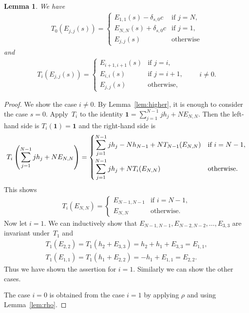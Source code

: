 \documentclass[pdftex]{sigma}
\newtheorem{lem}[thm]{Lemma}
\theoremstyle{definition}
\numberwithin{equation}{section}
\newcommand{\bfid}{\mathbf{1}}
\begin{document}
\begin{lem}\label{lem:diagonal}We have
\begin{gather*}
T_{0}(E_{j,j}(s)) = \begin{cases}
E_{1,1}(s)-\delta_{s,0}c &\text{if } j=N, \\
E_{N,N}(s)+\delta_{s,0}c &\text{if } j=1, \\
E_{j,j}(s) &\text{otherwise}
\end{cases}
\end{gather*}
and
\begin{gather*}
T_{i}(E_{j,j}(s)) = \begin{cases}
E_{i+1,i+1}(s) &\text{if } j=i, \\
E_{i,i}(s) &\text{if } j=i+1,\\
E_{j,j}(s) \ &\text{otherwise},
\end{cases}\qquad i \neq 0.
\end{gather*}
\end{lem}
\begin{proof}We show the case $i \neq 0$. By Lemma~\ref{lem:higher}, it is enough to consider the case $s=0$. Apply~$T_i$ to the identity $\bfid = \sum\limits_{j=1}^{N-1} j h_j + N E_{N,N}$. Then the left-hand side is $T_i(\bfid) = \bfid$ and the right-hand side is
\begin{gather*}
T_i \left(\sum_{j=1}^{N-1} j h_j + N E_{N,N}\right) = \begin{cases}
\displaystyle\sum_{j=1}^{N-1} j h_j - N h_{N-1} + N T_{N-1}(E_{N,N}) & \text{if $i = N-1$}, \vspace{1mm}\\
\displaystyle\sum_{j=1}^{N-1} j h_j + N T_i(E_{N,N}) & \text{otherwise}.
\end{cases}
\end{gather*}
This shows
\begin{gather*}
T_i (E_{N,N}) = \begin{cases}
E_{N-1,N-1} & \text{if $i = N-1$}, \\
E_{N,N} & \text{otherwise}.
\end{cases}
\end{gather*}
Now let $i=1$. We can inductively show that $E_{N-1,N-1}, E_{N-2,N-2}, \ldots, E_{3,3}$ are invariant under~$T_1$ and
\begin{gather*}
T_1(E_{2,2}) = T_1(h_2 + E_{3,3}) = h_2 + h_1 + E_{3,3} = E_{1,1},\\
T_1(E_{1,1}) = T_1(h_1 + E_{2,2}) = -h_1 + E_{1,1} = E_{2,2}.
\end{gather*}
Thus we have shown the assertion for $i=1$. Similarly we can show the other cases.

The case $i=0$ is obtained from the case $i=1$ by applying $\rho$ and using Lemma~\ref{lem:rho}.
\end{proof}
\end{document}
